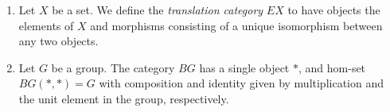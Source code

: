 %
%
%
%
%

\begin{Defi}\label{Defi:e_b}
  \begin{enumerate}
    \item Let $X$ be a set. We define the \textit{translation category} $EX$ to have objects the elements of $X$ and morphisms consisting of a unique isomorphism between any two objects.
    \item Let $G$ be a group. The category $BG$ has a single object $*$, and hom-set $BG(*,*) = G$ with composition and identity given by multiplication and the unit element in the group, respectively.
  \end{enumerate}
\end{Defi}


